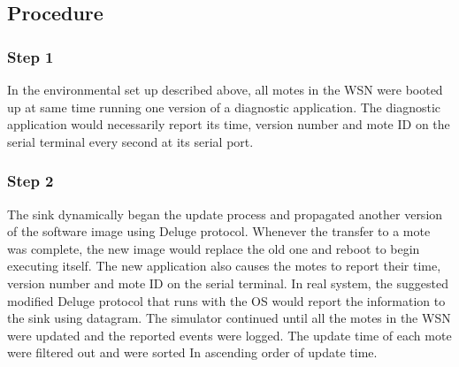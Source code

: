 \documentclass[conference,manuscript]{IEEEtran}
\begin{document}
\subsection*{Procedure}
\label{subsec:proc}
%
%
%
\subsubsection*{Step 1} 
In the environmental set up described above, all motes in the WSN were booted up at same time running one version of a diagnostic application. 
The diagnostic application would necessarily report its time, version number and mote ID on the serial terminal every second at its serial port. 


\subsubsection*{Step 2} 
The sink dynamically began the update process and propagated another version of the software image using Deluge protocol. %
Whenever the transfer to a mote was complete, the new image would replace the old one and reboot to begin executing itself.
The  new application also causes the motes to report their time, version number and mote ID on the serial terminal. 
In real system, the suggested modified Deluge protocol that runs with the OS would report the information to the sink using datagram.
The simulator continued until all the motes in the WSN were updated and the reported events were logged. 
The update time of each mote were filtered out  and were sorted In ascending order of update time.

\end{document}
